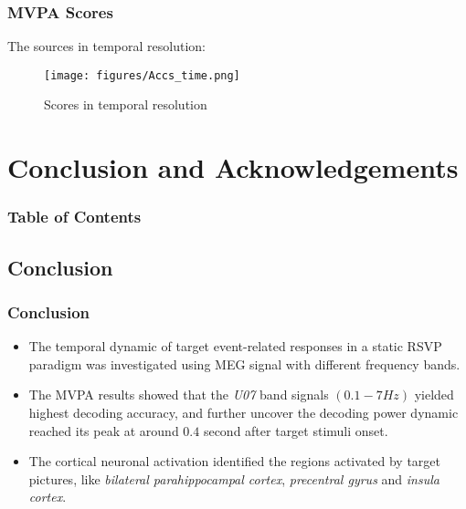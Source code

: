 \documentclass[aspectratio=169]{beamer}
\begin{document}
\begin{frame}
    \frametitle{MVPA Scores}
    The sources in temporal resolution:

    \begin{figure}[h]
        \centering
        \texttt{[image: figures/Accs\_time.png]}
        \caption{Scores in temporal resolution}
    \end{figure}

\end{frame}

\section{Conclusion and Acknowledgements}

\begin{frame}[plain]
    \frametitle{Table of Contents}
\end{frame}

\subsection{Conclusion}

\begin{frame}
    \frametitle{Conclusion}
    \begin{itemize}
        \item The temporal dynamic of target event-related responses in a static RSVP paradigm was investigated using MEG signal with different frequency bands.
        \item The MVPA results showed that the \emph{U07} band signals $(0.1-7 Hz)$ yielded highest decoding accuracy, and further uncover the decoding power dynamic reached its peak at around $0.4$ second after target stimuli onset.
        \item The cortical neuronal activation identified the regions activated by target pictures, like \emph{bilateral parahippocampal cortex}, \emph{precentral gyrus} and \emph{insula cortex}.
    \end{itemize}
\end{frame}
\end{document}
